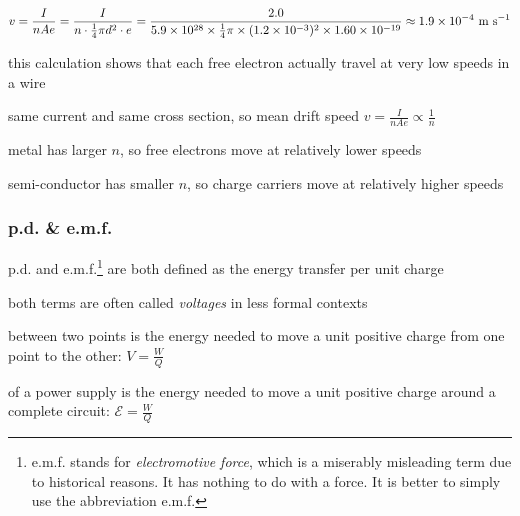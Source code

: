 
\solc\begin{equation*}
v = \frac{I}{nAe} = \frac{I}{n\cdot\frac{1}{4} \pi d^2 \cdot e} = \frac{2.0}{5.9\times10^{28} \times \frac{1}{4}\pi \times (1.2\times10^{-3})^2\times1.60\times10^{-19}} \approx 1.9\times10^{-4} \text{ m s$^{-1}$}
\end{equation*}

this calculation shows that each free electron actually travel at very low speeds in a wire \eoe


\sol same current and same cross section, so mean drift speed $ v = \frac{I}{nAe} \propto \frac{1}{n}$

metal has larger $n$, so free electrons move at relatively lower speeds

semi-conductor has smaller $n$, so charge carriers move at relatively higher speeds \eoe




\subsubsection{p.d. \& e.m.f.}\label{ch:potential-difference}

p.d. and e.m.f.\footnote{e.m.f. stands for \emph{electromotive force}, which is a miserably misleading term due to historical reasons. It has nothing to do with a force. It is better to simply use the abbreviation e.m.f.} are both defined as the energy transfer per unit charge

both terms are often called \emph{voltages} in less formal contexts

\begin{ilight}
	 between two points is the energy needed to move a unit positive charge from one point to the other: $\boxed{V=\frac{W}{Q}} $ 
\end{ilight}

\begin{ilight}
	 of a power supply is the energy needed to move a unit positive charge around a complete circuit: $\boxed{\mathcal{E}=\frac{W}{Q}} $ 
\end{ilight}


